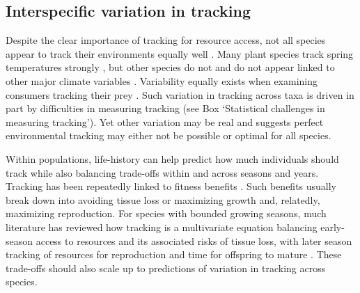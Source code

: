 \documentclass[11pt,letterpaper]{article}
\begin{document}
\subsection{Interspecific variation in tracking}
Despite the clear importance of tracking for resource access, not all species appear to track their environments equally well \citep{thackeray2016}. Many plant species track spring temperatures strongly \citep[multiple meta-analysis now show plants's spring phenology on average track spring or annual temperatures 4-6 days/$\degree$C][and simple temperature models can often explain over 90\% of interannual variation in phenology]{Richardson:2006qh,Wolkovich:2012n,thackeray2016}, but other species do not \citep{Cook:2012pnas} and do not appear linked to other major climate variables \citep{thackeray2016}. Variability equally exists when examining consumers tracking their prey \citep[across diverse species tracking over time is 6.1 days/decade but ranges from zero to 15 days/decade, see][]{kharouba2018}. Such variation in tracking across taxa is driven in part by difficulties in measuring tracking (see Box `Statistical challenges in measuring tracking'). Yet other variation may be real and suggests perfect environmental tracking may either not be possible or optimal for all species. 

Within populations, life-history can help predict how much individuals should track while also balancing trade-offs within and across seasons and years. Tracking has been repeatedly linked to fitness benefits \citep[e.g.,][]{farzan2018,deacy2018}. Such benefits usually break down into avoiding tissue loss or maximizing growth and, relatedly, maximizing reproduction. For species with bounded growing seasons, much literature has reviewed how tracking is a multivariate equation balancing early-season access to resources and its associated risks of tissue loss, with later season tracking of resources for reproduction and time for offspring to mature \citep{donohue2002,Morin:2005ye,Burghardt2015}. These trade-offs should also scale up to predictions of variation in tracking across species. %
\end{document}
